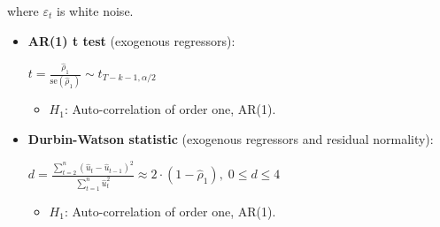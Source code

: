 \documentclass[10pt, a4paper, landscape]{article}
\newcommand{\se}{\mathrm{se}}
\begin{document}
\begin{multicols}{3}
\begin{itemize}[leftmargin=*]
			where $\varepsilon_{t}$ is white noise.
			
			\begin{itemize}[leftmargin=*]
				\item \textbf{AR(1) t test} (exogenous regressors):
				
				\begin{center}
					$t = \frac{\hat{\rho}_{1}}{\se(\hat{\rho}_{1})} \sim t_{T - k - 1, \alpha/2}$
				\end{center}
				
				\begin{itemize}[leftmargin=*]
					\item $H_{1}$: Auto-correlation of order one, AR(1).
				\end{itemize}
				
				\item \textbf{Durbin-Watson statistic} (exogenous regressors and residual normality):
				
				\begin{center}
					$d = \frac{\sum_{t=2}^{n} (\hat{u}_{t} - \hat{u}_{t - 1})^{2}}{\sum_{t=1}^{n} \hat{u}_{t}^{2}} \approx 2 \cdot (1 - \hat{\rho}_{1}), \; 0 \leq d \leq 4$
				\end{center}
				
				\begin{itemize}[leftmargin=*]
					\item $H_{1}$: Auto-correlation of order one, AR(1).
				\end{itemize}
				
				\begin{center}
					

\end{center}
\end{itemize}
\end{itemize}
\end{multicols}
\end{document}
